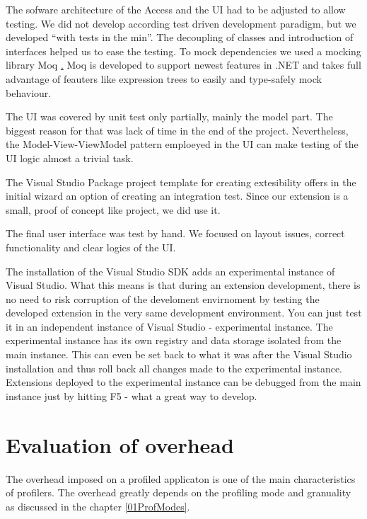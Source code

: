The sofware architecture of the Access and the UI had to be adjusted to allow testing. We did not develop according test driven development paradigm, but we developed ``with tests in the min''. The decoupling of classes and introduction of interfaces helped us to ease the testing. To mock dependencies we used a mocking library Moq \href{{http://code.google.com/p/moq/}{http://code.google.com/p/moq/}}. Moq is developed to support newest features in .NET and takes full advantage of feauters like expression trees to easily and type-safely mock behaviour. 

The UI was covered by unit test only partially, mainly the model part. The biggest reason for that was lack of time in the end of the project. Nevertheless, the Model-View-ViewModel pattern emploeyed in the UI can make testing of the UI logic almost a trivial task. 

The Visual Studio Package project template for creating extesibility offers in the initial wizard an option of creating an integration test. Since our extension is a small, proof of concept like project, we did use it. 

The final user interface was test by hand. We focused on layout issues, correct functionality and clear logics of the UI.

The installation of the Visual Studio SDK adds an experimental instance of Visual Studio. What this means is that during an extension development, there is no need to risk corruption of the develoment envirnoment by testing the developed extension in the very same development environment. You can just test it in an independent instance of Visual Studio - experimental instance. The experimental instance has its own registry and data storage isolated from the main instance. This can even be set back to what it was after the Visual Studio installation and thus roll back all changes made to the experimental instance. Extensions deployed to the experimental instance can be debugged from the main instance just by hitting F5 - what a great way to develop. 



\section{Evaluation of overhead}
The overhead imposed on a profiled applicaton is one of the main characteristics of profilers. The overhead greatly depends on the profiling mode and granuality as discussed in the chapter \ref{01ProfModes}.

